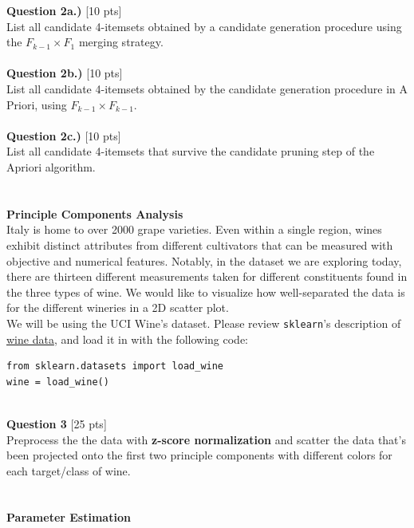 \documentclass[paper=a4, fontsize=11pt]{scrartcl} %
\begin{document}
{\Large \textbf{Question 2a.)} [10 pts]} \\
List all candidate 4-itemsets obtained by a candidate generation procedure using the $F_{k - 1} \times F_1$ merging strategy. \\
\\
{\Large \textbf{Question 2b.)} [10 pts]} \\
List all candidate 4-itemsets obtained by the candidate generation procedure in A Priori, using $F_{k-1} \times F_{k-1}$. \\
\\
{\Large \textbf{Question 2c.)} [10 pts]} \\
List all candidate 4-itemsets that survive the candidate pruning step of
the Apriori algorithm. \\
\\
\\
{\huge \textbf{Principle Components Analysis}} \\

Italy is home to over 2000 grape varieties. Even within a single region, wines exhibit distinct attributes from different cultivators that can be measured with objective and numerical features. Notably, in the dataset we are exploring today, there are thirteen different measurements taken for different constituents found in the three types of wine. We would like to visualize how well-separated the data is for the different wineries in a 2D scatter plot.\\

We will be using the UCI Wine's dataset. Please review \verb"sklearn"'s description of \href{https://scikit-learn.org/stable/modules/generated/sklearn.datasets.load_wine.html}{wine data}, and load it in with the following code:
\begin{verbatim}
from sklearn.datasets import load_wine
wine = load_wine()
\end{verbatim} \\

{\Large \textbf{Question 3} [25 pts]} \\

Preprocess the the data with \textbf{z-score normalization} and scatter the data that's been projected onto the first two principle components with different colors for each target/class of wine. \\
\\
\\
{\huge \textbf{Parameter Estimation}} \\
\end{document}
